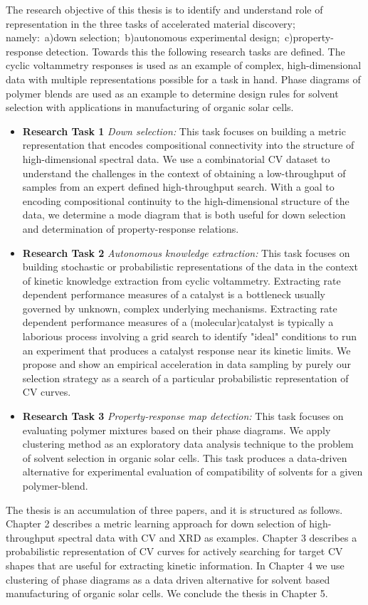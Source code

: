 The research objective of this thesis is to identify and understand role of representation in the three tasks of accelerated material discovery; namely:~a)down selection;~b)autonomous experimental design;~c)property-response detection. Towards this the following research tasks are defined. The cyclic voltammetry responses is used as an example of complex, high-dimensional data with multiple representations possible for a task in hand. Phase diagrams of polymer blends are used as an example to determine design rules for solvent selection with applications in manufacturing of organic solar cells.
\begin{itemize}
    \item {\textbf{Research Task 1 }\textit{Down selection:} This task focuses on building a metric representation that encodes compositional connectivity into the structure of high-dimensional spectral data. We use a combinatorial CV dataset to understand the challenges in the context of obtaining a low-throughput of samples from an expert defined high-throughput search. With a goal to encoding compositional continuity to the high-dimensional structure of the data, we determine a mode diagram that is both useful for down selection and determination of property-response relations.}
    \item{\textbf{Research Task 2 }\textit{Autonomous knowledge extraction:} This task focuses on building stochastic or probabilistic representations of the data in the context of kinetic knowledge extraction from cyclic voltammetry. Extracting rate dependent performance measures of a catalyst is a bottleneck usually governed by unknown, complex underlying mechanisms. Extracting rate dependent performance measures of a (molecular)catalyst is typically a laborious process involving a grid search to identify "ideal" conditions to run an experiment that produces a catalyst response near its kinetic limits. We propose and show an empirical acceleration in data sampling by purely our selection strategy as a search of a particular probabilistic representation of CV curves.}
    \item{\textbf{Research Task 3 }\textit{Property-response map detection: } This task focuses on evaluating polymer mixtures based on their phase diagrams. We apply clustering method as an exploratory data analysis technique to the problem of solvent selection in organic solar cells. This task produces a data-driven alternative for experimental evaluation of compatibility of solvents for a given polymer-blend.}
\end{itemize}

The thesis is an accumulation of three papers, and it is structured as follows. 
Chapter 2 describes a metric learning approach for down selection of high-throughput spectral data with CV and XRD as examples. 
Chapter 3 describes a probabilistic representation of CV curves for actively searching for target CV shapes that are useful for extracting kinetic information. 
In Chapter 4 we use clustering of phase diagrams as a data driven alternative for solvent based manufacturing of organic solar cells. 
We conclude the thesis in Chapter 5.
